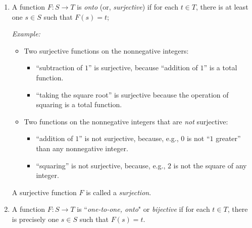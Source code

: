 \begin{enumerate}
\medskip\item
A function $F: S \rightarrow T$ is {\it onto} (or, {\it surjective}) if for each $t \in T$, there is at least one $s \in S$ such that $F(s) = t$;

\medskip

{\em Example:}
\begin{itemize}
\item
Two surjective functions on the nonnegative integers:
  \begin{itemize}
  \item
``subtraction of $1$'' is surjective, because ``addition of $1$'' is a total function.
  \medskip\item
``taking the square root'' is surjective because the operation of squaring is a total function.
  \end{itemize}
\medskip\item
Two functions on the nonnegative integers that are {\em not} surjective:
  \begin{itemize}
  \item
``addition of $1$'' is not surjective, because, e.g., $0$ is not ``$1$ greater'' than any nonnegative integer.
  \medskip\item
``squaring'' is not surjective, because, e.g., $2$ is not the square of any integer.
  \end{itemize}
\end{itemize}
A surjective function $F$ is called a {\it surjection}.

\medskip\item
A function $F: S \rightarrow T$ is ``{\it one-to-one, onto}" or {\it bijective} if for each $t \in T$, there is precisely one $s \in S$ such that $F(s) = t$.


\end{enumerate}
